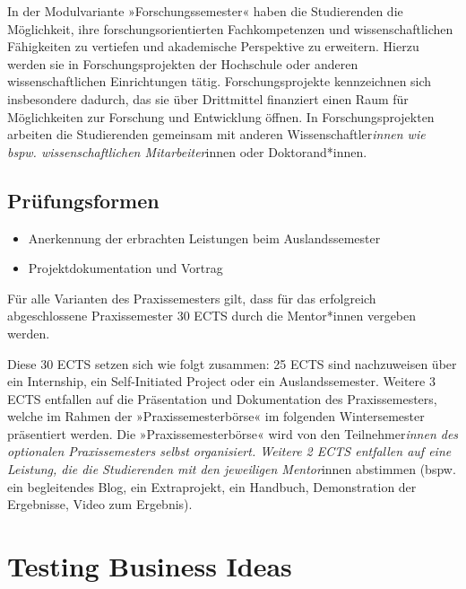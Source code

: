 In der Modulvariante »Forschungssemester« haben die Studierenden die
Möglichkeit, ihre forschungsorientierten Fachkompetenzen und
wissenschaftlichen Fähigkeiten zu vertiefen und akademische Perspektive
zu erweitern. Hierzu werden sie in Forschungsprojekten der Hochschule
oder anderen wissenschaftlichen Einrichtungen tätig. Forschungsprojekte
kennzeichnen sich insbesondere dadurch, das sie über Drittmittel
finanziert einen Raum für Möglichkeiten zur Forschung und Entwicklung
öffnen. In Forschungsprojekten arbeiten die Studierenden gemeinsam mit
anderen Wissenschaftler\emph{innen wie bspw. wissenschaftlichen
Mitarbeiter}innen oder Doktorand*innen.

\hypertarget{pruxfcfungsformenpathlabel....srcmodulbeschreibungen-bachelor-bpo5ba_praxissemester}{%
\section*{Prüfungsformen\label{../../src/modulbeschreibungen-bachelor-bpo5/BA_Praxissemester}}\label{pruxfcfungsformenpathlabel....srcmodulbeschreibungen-bachelor-bpo5ba_praxissemester}}

\begin{itemize}
\tightlist
\item
  Anerkennung der erbrachten Leistungen beim Auslandssemester
\item
  Projektdokumentation und Vortrag
\end{itemize}

Für alle Varianten des Praxissemesters gilt, dass für das erfolgreich
abgeschlossene Praxissemester 30 ECTS durch die Mentor*innen vergeben
werden.

Diese 30 ECTS setzen sich wie folgt zusammen: 25 ECTS sind nachzuweisen
über ein Internship, ein Self-Initiated Project oder ein
Auslandssemester. Weitere 3 ECTS entfallen auf die Präsentation und
Dokumentation des Praxissemesters, welche im Rahmen der
»Praxissemesterbörse« im folgenden Wintersemester präsentiert werden.
Die »Praxissemesterbörse« wird von den Teilnehmer\emph{innen des
optionalen Praxissemesters selbst organisiert. Weitere 2 ECTS entfallen
auf eine Leistung, die die Studierenden mit den jeweiligen Mentor}innen
abstimmen (bspw. ein begleitendes Blog, ein Extraprojekt, ein Handbuch,
Demonstration der Ergebnisse, Video zum Ergebnis).

\hypertarget{testing-business-ideaspathlabel....srcmodulbeschreibungen-bachelor-bpo5ba_product-dimensions}{%
\chapter{Testing Business
Ideas\label{../../src/modulbeschreibungen-bachelor-bpo5/BA_Product-Dimensions}}\label{testing-business-ideaspathlabel....srcmodulbeschreibungen-bachelor-bpo5ba_product-dimensions}}

